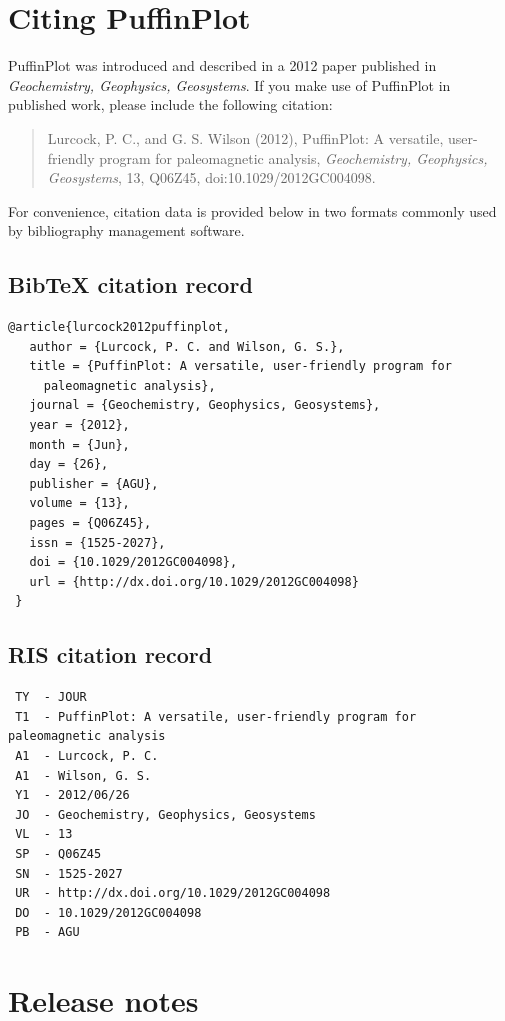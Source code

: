 \documentclass[a4paper,british]{article}
\begin{document}
\clearpage
\appendix
\section{Citing PuffinPlot\label{sec:citing-puffinplot}}

PuffinPlot was introduced and described in a 2012 paper published
in \emph{Geochemistry, Geophysics, Geosystems}. If you make use of
PuffinPlot in published work, please include the following citation:

\begin{quote}
Lurcock, P. C., and G. S. Wilson (2012), PuffinPlot: A versatile,
user-friendly program for paleomagnetic analysis, \emph{Geochemistry,
  Geophysics, Geosystems}, 13, Q06Z45, doi:10.1029/2012GC004098.
\end{quote}

\noindent For convenience, citation data is provided below in two formats
commonly used by bibliography management software.

\subsection*{BibTeX citation record}
\small
\begin{verbatim}
@article{lurcock2012puffinplot,
   author = {Lurcock, P. C. and Wilson, G. S.},
   title = {PuffinPlot: A versatile, user-friendly program for
     paleomagnetic analysis},
   journal = {Geochemistry, Geophysics, Geosystems},
   year = {2012},
   month = {Jun},
   day = {26},
   publisher = {AGU},
   volume = {13},
   pages = {Q06Z45},
   issn = {1525-2027},
   doi = {10.1029/2012GC004098},
   url = {http://dx.doi.org/10.1029/2012GC004098}
 }
\end{verbatim}

\subsection*{RIS citation record}
\small
\begin{verbatim}
 TY  - JOUR
 T1  - PuffinPlot: A versatile, user-friendly program for paleomagnetic analysis
 A1  - Lurcock, P. C.
 A1  - Wilson, G. S.
 Y1  - 2012/06/26
 JO  - Geochemistry, Geophysics, Geosystems
 VL  - 13
 SP  - Q06Z45
 SN  - 1525-2027
 UR  - http://dx.doi.org/10.1029/2012GC004098
 DO  - 10.1029/2012GC004098
 PB  - AGU
\end{verbatim}

\clearpage

\section{Release notes}
\end{document}
